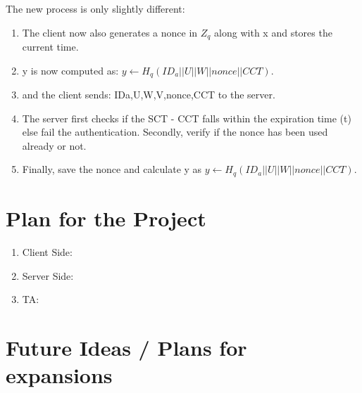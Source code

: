 \documentclass[]{article}   %
\begin{document}
The new process is only slightly different: 
\begin{enumerate}
    \item The client now also generates a nonce in $Z_q$ along with x and stores the current time.
    \item y is now computed as: $y \leftarrow H_q (ID_a || U || W || nonce || CCT).$
    \item and the client sends: {IDa,U,W,V,nonce,CCT} to the server.
    \item The server first checks if the SCT - CCT falls within the expiration time (t) else fail the authentication. Secondly, verify if the nonce has been used already or not. 
    \item Finally, save the nonce and calculate y as \newline $y \leftarrow H_q (ID_a || U || W || nonce || CCT).$
\end{enumerate}

\newpage
\section*{Plan for the Project}
\begin{enumerate}
    \item Client Side:
    \item Server Side:
    \item TA:
\end{enumerate}
\newpage
\section*{Future Ideas / Plans for expansions}


\nocite{*}


\end{document}
